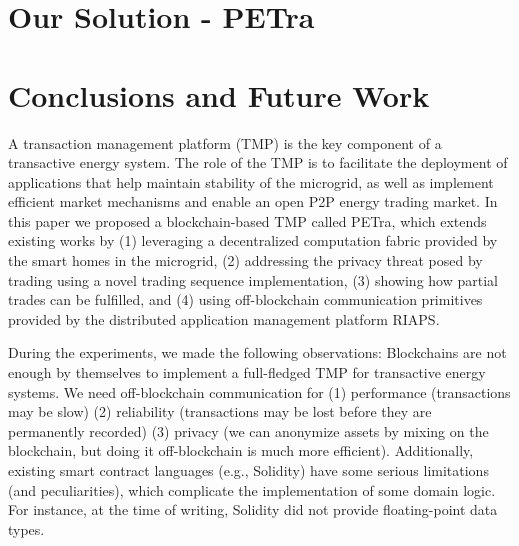 \documentclass[sigplan]{acmart}
\newcommand{\Abhishek}[1]{\todo[color=yellow!50, linecolor=black!50]{\textbf{Abhishek}: #1}}
\newcommand{\Karla}[1]{\todo[color=green!50, linecolor=black!50]{\textbf{Karla}: #1}}
\begin{document}
\section{Our Solution - PETra}











\section{Conclusions and Future Work}
A transaction management platform (TMP) is the key component of a transactive energy system. The role of the TMP is to facilitate the deployment of applications that help maintain stability of the microgrid, as well as implement efficient market mechanisms and enable an open P2P energy trading market. In this paper we proposed a blockchain-based TMP called PETra, which extends existing works by (1) leveraging a decentralized computation
fabric provided by the smart homes in the microgrid, (2) addressing the privacy threat posed by trading using a novel trading sequence implementation, (3) showing how partial trades can be fulfilled, and (4) using off-blockchain communication primitives provided by the distributed application management platform RIAPS. 

During the experiments, we made the following observations:
Blockchains are not enough by themselves to implement a full-fledged TMP for transactive energy systems. We need off-blockchain communication for (1) performance (transactions may be slow) (2) reliability (transactions may be lost before they are permanently recorded) (3) privacy (we can anonymize assets by mixing on the blockchain, but doing it off-blockchain is much more efficient). Additionally,  existing smart contract languages (e.g., Solidity) have some serious limitations (and peculiarities), which complicate the implementation of some domain logic. For instance, at the time of writing, Solidity did not provide floating-point data types.


 
\end{document}
